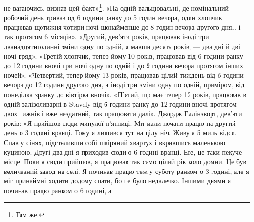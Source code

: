 \parcont{}  %
не вагаючись, визнав цей факт»\footnote{
Там же.
}. «На одній вальцювальні, де
номінальний робочий день тривав од 6 години ранку до 5  годин
вечора, один хлопчик працював щотижня чотири ночі щонайменше
до 8 годин вечора другого дня\dots{} і так протягом
6 місяців». «Другий, дев’яти років, працював іноді три дванадцятигодинні
зміни одну по одній, а мавши десять років, — два дні й
дві ночі вряд». «Третій хлопчик, тепер йому 10 років, працював
від 6 години ранку до 12 години вночі три ночі одну по одній і
до 9 години вечора протягом інших ночей». «Четвертий, тепер
йому 13 років, працював цілий тиждень від 6 години вечора до
12 години другого дня, а іноді три зміни одну по одній, приміром,
від понеділка зранку до вівтірка вночі». «П’ятий, що має тепер
12 років, працював в одній залізоливарні в Stavely від 6 години
ранку до 12 години вночі протягом двох тижнів і вже нездатний,
так працювати далі». Джордж Еллінзворт, дев’яти років: «Я прийшов
сюди минулої п’ятниці. Ми мали почати працю на другий
день о 3 годині вранці. Тому я лишився тут на цілу ніч. Живу я
5 миль відси. Спав у сінях, підстеливши собі шкіряний хвартух
і вкрившись маленькою куциною. Другі два дні я приходив сюди
о 6 годині вранці. Еге, це таки пекуче місце! Поки я сюди прийшов,
я працював так само цілий рік коло домни. Це був величезний
завод на селі. Я починав працю теж у суботу ранком о 3 годині, але я міг
принаймні ходити додому спати, бо це було
недалечко. Іншими днями я починав працю ранком о 6 годині, а
